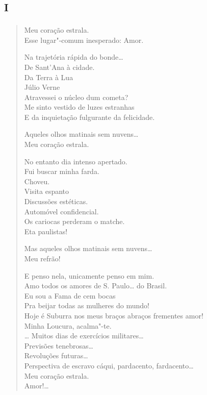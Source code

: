 \chapter[«Meu coração estrala»]{\textsc{i}}

\begin{verse}
Meu coração estrala.\\
Esse lugar"-comum inesperado: Amor.

\quad\quad\quad{}Na trajetória rápida do bonde\ldots{}\\
\quad\quad\quad\quad{}De Sant'Ana à cidade.\\
\quad\quad\quad\quad\quad{}Da Terra à Lua\\
\quad\quad\quad\quad\quad\quad{}Júlio Verne\\
\quad\quad\quad\quad\quad{}Atravessei o núcleo dum cometa?\\
\quad\quad\quad\quad{}Me sinto vestido de luzes estranhas\\
\quad\quad\quad\quad{}E da inquietação fulgurante da felicidade.

Aqueles olhos matinais sem nuvens\ldots{}\\
Meu coração estrala.

No entanto dia intenso apertado.\\
\quad\quad\quad\quad{}Fui buscar minha farda.\\
\quad\quad\quad\quad{}Choveu.\\
\quad\quad\quad\quad{}Visita espanto\\
\quad\quad\quad\quad{}Discussões estéticas.\\
\quad\quad\quad\quad{}Automóvel confidencial.\\
\quad\quad\quad\quad{}Os cariocas perderam o matche.\\
\quad\quad\quad\quad{}Eta paulistas!

Mas aqueles olhos matinais sem nuvens\ldots{}\\
Meu refrão!

E penso nela, unicamente penso em mim.\\
Amo todos os amores de S. Paulo\ldots{} do Brasil.\\
Eu sou a Fama de cem bocas\\
Pra beijar todas as mulheres do mundo!\\
Hoje é Suburra nos meus braços abraços frementes amor!\\
Minha Loucura, acalma"-te.\\
\ldots{} Muitos dias de exercícios militares\ldots{}\\
\quad\quad\quad\quad{}Previsões tenebrosas\ldots{}\\
\quad\quad\quad\quad\quad\quad{}Revoluções futuras\ldots{}\\
Perspectiva de escravo cáqui, pardacento, fardacento\ldots{}\\

Meu coração estrala.\\
Amor!\ldots{}
\end{verse}

